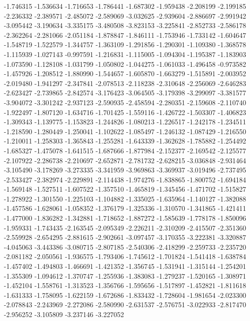 -1.746315
-1.536634
-1.716653
-1.786441
-1.687302
-1.959438
-2.208199
-2.199185
-2.236332
-2.389571
-2.485072
-2.589069
-3.032625
-2.939604
-2.886697
-2.991942
-3.095442
-3.190634
-3.335175
-3.480508
-3.823153
-3.225841
-2.852733
-2.586178
-2.362264
-2.281066
-2.051184
-1.878847
-1.846111
-1.753946
-1.733142
-1.604647
-1.548719
-1.522579
-1.344757
-1.363109
-1.291856
-1.290301
-1.109380
-1.368578
-1.115939
-1.027143
-0.997591
-1.216831
-1.115005
-1.094304
-1.195387
-1.183903
-1.073590
-1.128108
-1.031799
-1.050802
-1.044275
-1.061033
-1.496458
-0.973582
-1.457926
-1.208512
-1.880990
-1.544657
-1.605870
-1.663279
-1.515891
-2.003952
-2.019480
-1.941297
-2.347841
-2.078513
-2.118238
-2.310648
-2.256069
-2.646283
-2.623427
-2.739865
-2.842574
-3.176423
-3.064505
-3.179398
-3.299097
-3.381577
-3.904072
-3.301242
-2.937123
-2.590935
-2.458594
-2.280351
-2.159608
-2.110740
-1.922497
-1.807120
-1.634716
-1.701425
-1.559116
-1.426722
-1.503307
-1.406823
-1.309343
-1.139775
-1.153823
-1.244826
-1.080213
-1.226517
-1.242178
-1.234511
-1.218590
-1.280449
-1.250041
-1.102622
-1.085497
-1.246132
-1.087429
-1.216550
-1.210011
-1.258303
-1.365843
-1.255281
-1.643339
-1.362628
-1.785882
-1.254492
-1.685327
-1.475078
-1.641515
-1.687666
-1.877984
-2.152377
-2.169542
-2.125577
-2.107922
-2.286738
-2.210697
-2.652871
-2.781732
-2.628215
-3.036848
-2.931464
-3.105490
-3.178269
-3.273335
-3.341959
-3.969863
-3.369937
-3.019496
-2.737495
-2.533427
-2.382974
-2.229891
-2.114438
-1.974276
-1.838865
-1.800752
-1.694184
-1.569148
-1.527511
-1.607522
-1.357510
-1.465819
-1.345456
-1.471702
-1.515827
-1.278922
-1.301550
-1.225103
-1.104882
-1.335025
-1.635964
-1.140127
-1.382088
-1.457586
-1.628061
-1.058352
-1.376179
-1.325336
-1.310570
-1.341865
-1.421411
-1.477000
-1.836282
-1.342881
-1.718652
-1.887272
-1.585639
-1.778178
-1.850096
-1.959331
-1.743435
-2.163545
-2.095349
-2.226211
-2.310209
-2.415507
-2.351360
-2.559928
-2.654295
-2.881615
-2.902661
-3.097457
-3.170355
-3.222381
-3.320887
-4.045063
-3.443386
-3.080715
-2.807185
-2.540306
-2.418299
-2.259733
-2.235720
-2.081182
-2.050561
-1.936575
-1.793406
-1.745612
-1.701824
-1.541418
-1.638784
-1.457402
-1.494803
-1.466691
-1.421352
-1.356745
-1.531941
-1.315144
-1.254201
-1.355309
-1.094612
-1.370747
-1.255936
-1.383083
-1.279237
-1.520165
-1.308971
-1.452104
-1.558761
-1.313523
-1.356766
-1.595656
-1.517897
-1.452821
-1.811618
-1.631333
-1.758095
-1.622159
-1.672686
-1.833432
-1.728604
-1.981654
-2.023300
-2.078843
-2.243969
-2.272086
-2.580990
-2.631537
-2.576751
-3.022933
-2.817470
-2.956252
-3.105809
-3.237146
-3.227052
